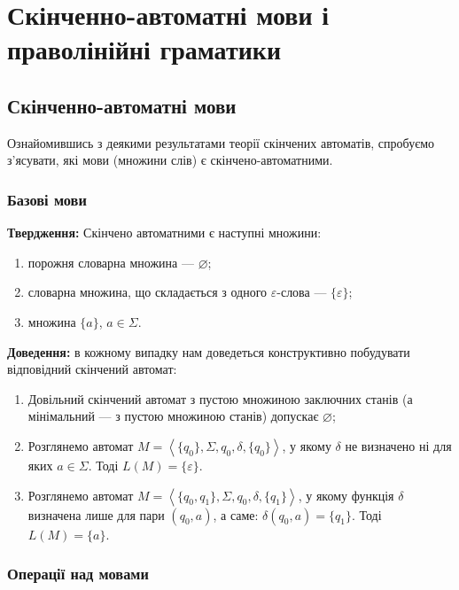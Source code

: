 \setcounter{section}{3}

\section{Скінченно-автоматні мови і праволінійні граматики}

\subsection{Скінченно-автоматні мови}

Ознайомившись з деякими результатами теорії скінчених автоматів, спробуємо з'ясувати, які мови (множини слів) є скінчено-автоматними.

\subsubsection{Базові мови}

\textbf{Твердження:} Скінчено автоматними є наступні множини:
\begin{enumerate}
	\item порожня словарна множина --- $\varnothing$;
	\item словарна множина, що складається з одного $\varepsilon$-слова --- $\{\varepsilon\}$;
	\item множина $\{a\}$, $a \in \Sigma$.
\end{enumerate}

\textbf{Доведення:} в кожному випадку нам доведеться конструктивно побудувати відповідний скінчений автомат:
\begin{enumerate}
	\item Довільний скінчений автомат з пустою множиною заключних станів (а мінімальний --- з пустою множиною станів) допускає $\varnothing$;
	\item Розглянемо автомат $M = \left\langle \{q_0\}, \Sigma, q_0, \delta, \{q_0\}\right\rangle$, у якому $\delta$ не визначено ні для яких $a \in \Sigma$. Тоді $L(M) = \{\varepsilon\}$.
	\item Розглянемо автомат $M = \left\langle \{q_0, q_1\}, \Sigma, q_0, \delta, \{q_1\}\right\rangle$, у якому функція $\delta$ визначена лише для пари $(q_0, a)$, а саме: $\delta(q_0, a) = \{q_1\}$. Тоді $L(M) = \{a\}$.
\end{enumerate}

\subsubsection{Операції над мовами}

